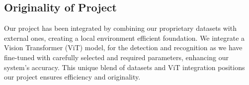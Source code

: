 \subsection{Originality of Project}
Our project has been integrated by combining our proprietary datasets with external ones, creating a local environment efficient foundation. We integrate a Vision Transformer (ViT) model, for the detection and recognition as we have fine-tuned with carefully selected and required parameters, enhancing our system's accuracy. This unique blend of datasets and ViT integration positions our project ensures efficiency and originality.